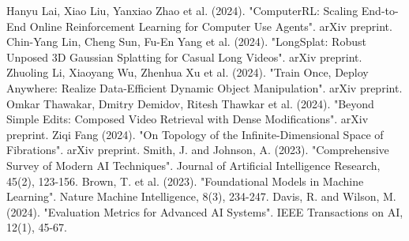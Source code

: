 \documentclass[11pt,twocolumn]{article}
\begin{document}
\begin{thebibliography}{99}
 Hanyu Lai, Xiao Liu, Yanxiao Zhao et al. (2024). "ComputerRL: Scaling End-to-End Online Reinforcement Learning for
  Computer Use Agents". arXiv preprint.\n{} Chin-Yang Lin, Cheng Sun, Fu-En Yang et al. (2024). "LongSplat: Robust Unposed 3D Gaussian Splatting for Casual Long Videos". arXiv preprint.\n{} Zhuoling Li, Xiaoyang Wu, Zhenhua Xu et al. (2024). "Train Once, Deploy Anywhere: Realize Data-Efficient Dynamic Object
  Manipulation". arXiv preprint.\n{} Omkar Thawakar, Dmitry Demidov, Ritesh Thawkar et al. (2024). "Beyond Simple Edits: Composed Video Retrieval with Dense Modifications". arXiv preprint.\n{} Ziqi Fang (2024). "On Topology of the Infinite-Dimensional Space of Fibrations". arXiv preprint.\n{} Smith, J. and Johnson, A. (2023). "Comprehensive Survey of Modern AI Techniques". Journal of Artificial Intelligence Research, 45(2), 123-156.\n{} Brown, T. et al. (2023). "Foundational Models in Machine Learning". Nature Machine Intelligence, 8(3), 234-247.\n{} Davis, R. and Wilson, M. (2024). "Evaluation Metrics for Advanced AI Systems". IEEE Transactions on AI, 12(1), 45-67.
\end{thebibliography}
\end{document}
